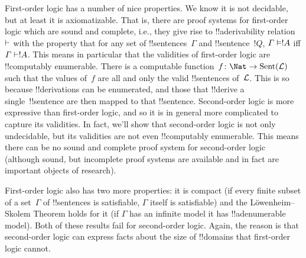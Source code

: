 \documentclass[../../../include/open-logic-section]{subfiles}
\begin{document}


First-order logic has a number of nice properties. We know it is not
decidable, but at least it is axiomatizable. That is, there are proof
systems for first-order logic which are sound and complete, i.e., they
give rise to !!a{derivability} relation~$\Proves$ with the property
that for any set of !!{sentence}s~$\Gamma$ and !!{sentence}~$!Q$,
$\Gamma \Entails !A$ iff $\Gamma \Proves !A$.  This means in
particular that the validities of first-order logic are !!{computably
  enumerable}. There is a computable function~$f\colon \Nat \to
\Sent[L]$ such that the values of~$f$ are all and only the valid
!!{sentence}s of~$\Lang{L}$. This is so because !!{derivation}s can be
enumerated, and those that !!{derive} a single~!!{sentence} are then
mapped to that !!{sentence}.  Second-order logic is more expressive
than first-order logic, and so it is in general more complicated to
capture its validities.  In fact, we'll show that second-order logic
is not only undecidable, but its validities are not even !!{computably
  enumerable}. This means there can be no sound and complete proof
system for second-order logic (although sound, but incomplete proof
systems are available and in fact are important objects of research).

First-order logic also has two more properties: it is compact (if
every finite subset of a set~$\Gamma$ of !!{sentence}s is satisfiable,
$\Gamma$ itself is satisfiable) and the L\"owenheim--Skolem Theorem
holds for it (if $\Gamma$ has an infinite model it has
!!a{denumerable} model). Both of these results fail for second-order
logic. Again, the reason is that second-order logic can express facts
about the size of !!{domain}s that first-order logic cannot.
\end{document}
